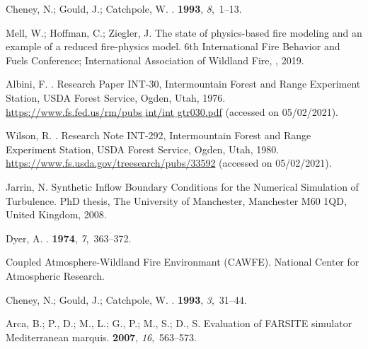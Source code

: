\documentclass[atmosphere,article,accept,moreauthors,pdftex]{Definitions/mdpi}
\begin{document}
\begin{thebibliography}{999}
Cheney, N.; Gould, J.; Catchpole, W.
.
 {\bf 1993}, {\em
  8},~1--13.

Mell, W.; Hoffman, C.; Ziegler, J.
\newblock The state of physics-based fire modeling and an example of a reduced
  fire-physics model.
\newblock  6th International Fire Behavior and Fuels Conference; International
  Association of Wildland Fire, ,  2019.

Albini, F.
.
\newblock Research Paper INT-30, Intermountain Forest and Range Experiment
  Station, USDA Forest Service, Ogden, Utah,  1976.
\newblock
  \href{https://www.fs.fed.us/rm/pubs_int/int_gtr030.pdf}{https://www.fs.fed.us/rm/pubs$\_$int/int$\_$gtr030.pdf} (accessed on 05/02/2021).

Wilson, R.
.
\newblock Research Note INT-292, Intermountain Forest and Range Experiment
  Station, USDA Forest Service, Ogden, Utah,  1980.
\newblock
  \href{https://www.fs.usda.gov/treesearch/pubs/33592}{https://www.fs.usda.gov/treesearch/pubs/33592} (accessed on 05/02/2021).

Jarrin, N.
\newblock Synthetic Inflow Boundary Conditions for the Numerical Simulation of
  Turbulence.
\newblock PhD thesis, The University of Manchester, Manchester M60 1QD, United
  Kingdom,  2008.

Dyer, A.
.
 {\bf 1974}, {\em 7},~363--372.

{Coupled Atmosphere-Wildland Fire Environmant (CAWFE)}.
\newblock National Center for Atmospheric Research.

Cheney, N.; Gould, J.; Catchpole, W.
.
 {\bf 1993}, {\em
  3},~31--44.

Arca, B.; P., D.; M., L.; G., P.; M., S.; D., S.
\newblock Evaluation of FARSITE simulator Mediterranean marquis.
 {\bf 2007}, {\em
  16},~563--573.


\end{thebibliography}
\end{document}
